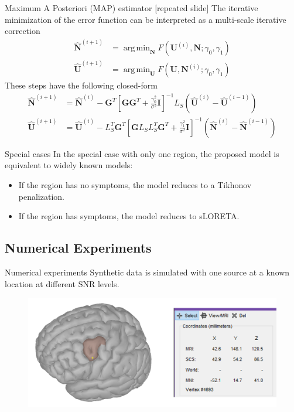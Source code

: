 \documentclass[progressbar=head]{beamer}
\newcommand{\ppar}[1]{ \left( #1 \right) }
\newcommand{\spar}[1]{ \left[ #1 \right] }
\DeclareMathOperator*{\argmin}{arg\,min}
\newcommand{\G}{\mathbf{G}}
\newcommand{\U}{\mathbf{U}}
\newcommand{\N}{\mathbf{N}}
\newcommand{\id}{\mathbf{I}}
\begin{document}
\begin{frame}{Maximum A Posteriori (MAP) estimator [repeated slide]}
    The iterative minimization of the error function can be interpreted as a multi-scale iterative correction
    \begin{align}
        \hat{\N}^{(i+1)} &= \argmin_{\N} F\ppar{\U^{(i)},\N; \gamma_0, \gamma_1}
        \\
        \hat{\U}^{(i+1)} &= \argmin_{\U} F\ppar{\U,\N^{(i)}; \gamma_0, \gamma_1}
    \end{align}
    These steps have the following closed-form
    \begin{align}
        \hat{\N}^{(i+1)} &=
        \hat{\N}^{(i)}
        -
        \G^T \spar{\G \G^T + \frac{\gamma_0^2}{\sigma^2} \id}^{-1} L_S \ppar{\hat{\U}^{(i)}-\hat{\U}^{(i-1)} }
        \\
        \hat{\U}^{(i+1)} &=
        \hat{\U}^{(i)}
        -
        L_S^T \G^T \spar{\G L_S L_S^T \G^T + \frac{\gamma_1^2}{\sigma^2} \id}^{-1} \ppar{\hat{\N}^{(i)}-\hat{\N}^{(i-1)} }
    \end{align}
\end{frame}

\begin{frame}{Special cases}
In the special case with only one region, the proposed model is equivalent to widely known models:
\begin{itemize}
\item If the region has no symptoms, the model reduces to a Tikhonov penalization.
\item If the region has symptoms, the model reduces to sLORETA.
\end{itemize}
\end{frame}


{
\subsection{Numerical Experiments}
}

\begin{frame}{Numerical experiments}
Synthetic data is simulated with one source at a known location at different SNR levels. 
\begin{figure}
\centering
\includegraphics[width=0.8\linewidth]{./img_oldbeamer/protocol1}
\end{figure}
\end{frame}
\end{document}
